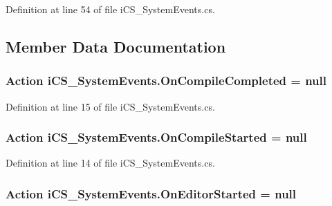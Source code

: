 Definition at line 54 of file i\+C\+S\+\_\+\+System\+Events.\+cs.



\subsection{Member Data Documentation}
\hypertarget{classi_c_s___system_events_aab0661932933129471b45b7cd42ec936}{
\subsubsection[{On\+Compile\+Completed}]{\setlength{\rightskip}{0pt plus 5cm}Action i\+C\+S\+\_\+\+System\+Events.\+On\+Compile\+Completed = null\hspace{0.3cm}{\ttfamily [static]}}}\label{classi_c_s___system_events_aab0661932933129471b45b7cd42ec936}


Definition at line 15 of file i\+C\+S\+\_\+\+System\+Events.\+cs.

\hypertarget{classi_c_s___system_events_a3ffced2361d71a4776609f100a54d010}{
\subsubsection[{On\+Compile\+Started}]{\setlength{\rightskip}{0pt plus 5cm}Action i\+C\+S\+\_\+\+System\+Events.\+On\+Compile\+Started = null\hspace{0.3cm}{\ttfamily [static]}}}\label{classi_c_s___system_events_a3ffced2361d71a4776609f100a54d010}


Definition at line 14 of file i\+C\+S\+\_\+\+System\+Events.\+cs.

\hypertarget{classi_c_s___system_events_a6b9b162a4d1a9d773aa00a92499c5672}{
\subsubsection[{On\+Editor\+Started}]{\setlength{\rightskip}{0pt plus 5cm}Action i\+C\+S\+\_\+\+System\+Events.\+On\+Editor\+Started = null\hspace{0.3cm}{\ttfamily [static]}}}\label{classi_c_s___system_events_a6b9b162a4d1a9d773aa00a92499c5672}


